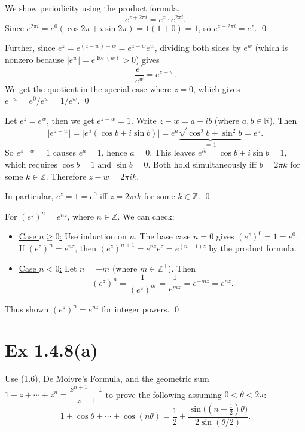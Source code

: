 \documentclass[a4paper]{article}
\begin{document}
\medskip\noindent
We show periodicity using the product formula,
\[
e^{z + 2\pi i} = e^z \cdot e^{2\pi i}.
\]
Since $e^{2\pi i} = e^0(\cos 2\pi + i\sin 2\pi) = 1(1 + 0) = 1$, so $e^{z+2\pi i} = e^z$. \qed

\medskip\noindent
Further, since $e^z = e^{(z-w)+w} = e^{z-w} e^w$, dividing both sides by $e^w$ (which is nonzero because $|e^w| = e^{\operatorname{Re}(w)} > 0$) gives
\[
\frac{e^z}{e^w} = e^{z-w}.
\]
We get the quotient in the special case where $z = 0$, which gives $e^{-w} = e^0/e^w = 1/e^w$. \qed

\medskip\noindent
Let $e^z = e^w$, then we get $e^{z-w} = 1$.  Write $z - w = a + ib$ (where $a, b \in \mathbb{R}$).  Then
\[
|e^{z-w}| = |e^a(\cos b + i\sin b)| = e^a\underbrace{\sqrt{\cos^2 b + \sin^2 b}}_{=\,1} = e^a.
\]
So $e^{z-w} = 1$ causes $e^a = 1$, hence $a = 0$.  This leaves $e^{ib} = \cos b + i\sin b = 1$, which requires $\cos b = 1$ and $\sin b = 0$.  Both hold simultaneously iff $b = 2\pi k$ for some $k \in \mathbb{Z}$.  Therefore $z - w = 2\pi ik$.

In particular, $e^z = 1 = e^0$ iff $z = 2\pi ik$ for some $k \in \mathbb{Z}$. \qed

\medskip\noindent
For $(e^z)^n = e^{nz}$, where $n \in \mathbb{Z}$. We can check:
\begin{itemize}
    \item \underline{Case $n \geq 0$:} Use induction on $n$.  The base case $n = 0$ gives $(e^z)^0 = 1 = e^0$.  If $(e^z)^n = e^{nz}$, then $(e^z)^{n+1} = e^{nz} e^z = e^{(n+1)z}$ by the product formula.
    
    \item \underline{Case $n < 0$:} Let $n = -m$ (where $m \in \mathbb{Z^+}$). Then
    \[
    (e^z)^n = \frac{1}{(e^z)^m} = \frac{1}{e^{mz}} = e^{-mz} = e^{nz}.
    \]
\end{itemize}
Thus shown $(e^z)^n = e^{nz}$ for integer powers. \qed
\newpage
\section*{Ex 1.4.8(a)}

\begin{tcolorbox}[colback=gray!10, colframe=black, boxrule=0.5pt, arc=2mm]
Use (1.6), De Moivre's Formula, and the geometric sum $1 + z + \cdots + z^n = \dfrac{z^{n+1}-1}{z-1}$ to prove the following assuming $0 < \theta < 2\pi$:
\[
1 + \cos\theta + \cdots + \cos(n\theta) = \frac{1}{2} + \frac{\sin\bigl((n+\tfrac{1}{2})\theta\bigr)}{2\sin(\theta/2)}.
\]
\end{tcolorbox}
\end{document}
